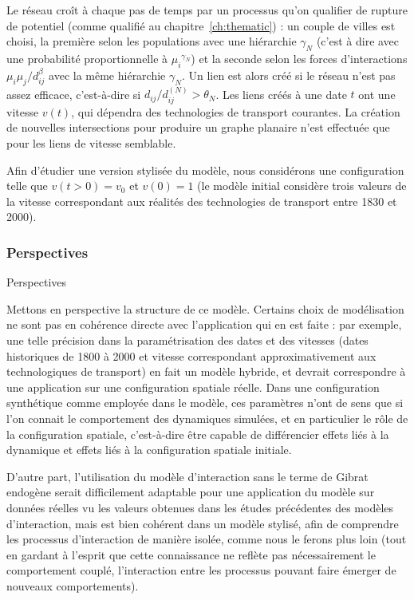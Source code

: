 
Le réseau croît à chaque pas de temps par un processus qu'on qualifier de rupture de potentiel (comme qualifié au chapitre~\ref{ch:thematic}) : un couple de villes est choisi, la première selon les populations avec une hiérarchie $\gamma_N$ (c'est à dire avec une probabilité proportionnelle à ${\mu_i}^{\gamma_N}$) et la seconde selon les forces d'interactions $\mu_i \mu_j / d_{ij}^\beta$ avec la même hiérarchie $\gamma_N$. Un lien est alors créé si le réseau n'est pas assez efficace, c'est-à-dire si $d_{ij}/d^{(N)}_{ij}> \theta_N$. Les liens créés à une date $t$ ont une vitesse $v(t)$, qui dépendra des technologies de transport courantes. La création de nouvelles intersections pour produire un graphe planaire n'est effectuée que pour les liens de vitesse semblable.

Afin d'étudier une version stylisée du modèle, nous considérons une configuration telle que $v(t > 0) = v_0$ et $v(0) = 1$ (le modèle initial considère trois valeurs de la vitesse correspondant aux réalités des technologies de transport entre 1830 et 2000).


\subsubsection{Perspectives}{Perspectives}

Mettons en perspective la structure de ce modèle. Certains choix de modélisation ne sont pas en cohérence directe avec l'application qui en est faite : par exemple, une telle précision dans la paramétrisation des dates et des vitesses (dates historiques de 1800 à 2000 et vitesse correspondant approximativement aux technologiques de transport) en fait un modèle hybride, et devrait correspondre à une application sur une configuration spatiale réelle. Dans une configuration synthétique comme employée dans le modèle, ces paramètres n'ont de sens que si l'on connait le comportement des dynamiques simulées, et en particulier le rôle de la configuration spatiale, c'est-à-dire être capable de différencier effets liés à la dynamique et effets liés à la configuration spatiale initiale. 

D'autre part, l'utilisation du modèle d'interaction sans le terme de Gibrat endogène serait difficilement adaptable pour une application du modèle sur données réelles vu les valeurs obtenues dans les études précédentes des modèles d'interaction, mais est bien cohérent dans un modèle stylisé, afin de comprendre les processus d'interaction de manière isolée, comme nous le ferons plus loin (tout en gardant à l'esprit que cette connaissance ne reflète pas nécessairement le comportement couplé, l'interaction entre les processus pouvant faire émerger de nouveaux comportements).


